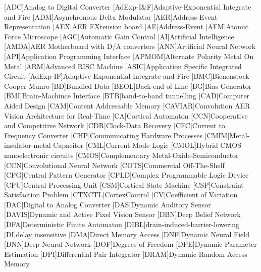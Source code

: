 \begin{acronym}
[ADC]{Analog to Digital Converter}
[AdExp-I\&F]{Adaptive-Exponential Integrate and Fire}
[ADM]{Asynchronous Delta Modulator}
[AER]{Address-Event Representation}
[AEX]{AER EXtension board}
[AE]{Address-Event}
[AFM]{Atomic Force Microscope}
[AGC]{Automatic Gain Control}
[AI]{Artificial Intelligence}
[AMDA]{AER Motherboard with D/A converters}
[ANN]{Artificial Neural Network}
[API]{Application Programming Interface}
[APMOM]{Alternate Polarity Metal On Metal}
[ARM]{Advanced RISC Machine}
[ASIC]{Application Specific Integrated Circuit}
[AdExp-IF]{Adaptive Exponential Integrate-and-Fire}
[BMC]{Bienenstock-Cooper-Munro}
[BD]{Bundled Data}
[BEOL]{Back-end of Line}
[BG]{Bias Generator}
[BMI]{Brain-Machince Interface}
[BTB]{band-to-band tunnelling}
[CAD]{Computer Aided Design}
[CAM]{Content Addressable Memory}
[CAVIAR]{Convolution AER Vision Architecture for Real-Time}
[CA]{Cortical Automaton}
[CCN]{Cooperative and Competitive Network}
[CDR]{Clock-Data Recovery}
[CFC]{Current to Frequency Converter}
[CHP]{Communicating Hardware Processes}
[CMIM]{Metal-insulator-metal Capacitor}
[CML]{Current Mode Logic}
[CMOL]{Hybrid CMOS nanoelectronic circuits}
[CMOS]{Complementary Metal-Oxide-Semiconductor}
[CCN]{Convolutional Neural Network}
[COTS]{Commercial Off-The-Shelf}
[CPG]{Central Pattern Generator}
[CPLD]{Complex Programmable Logic Device}
[CPU]{Central Processing Unit}
[CSM]{Cortical State Machine}
[CSP]{Constraint Satisfaction Problem}
[CTXCTL]{CortexControl}
[CV]{Coefficient of Variation}
[DAC]{Digital to Analog Converter}
[DAS]{Dynamic Auditory Sensor}
[DAVIS]{Dynamic and Active Pixel Vision Sensor}
[DBN]{Deep Belief Network}
[DFA]{Deterministic Finite Automaton}
[DIBL]{drain-induced-barrier-lowering}
[DI]{delay insensitive}
[DMA]{Direct Memory Access}
[DNF]{Dynamic Neural Field}
[DNN]{Deep Neural Network}
[DOF]{Degrees of Freedom}
[DPE]{Dynamic Parameter Estimation}
[DPI]{Differential Pair Integrator}
[DRAM]{Dynamic Random Access Memory}

\end{acronym}
